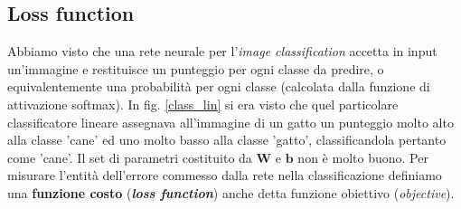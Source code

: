 \subsection{Loss function}
\label{loss}
Abbiamo visto che una rete neurale per l'\textit{image classification} accetta in input un'immagine e restituisce un punteggio per ogni classe da predire, o equivalentemente una probabilità per ogni classe (calcolata dalla funzione di attivazione softmax). In fig. \ref{class_lin} si era visto che quel particolare classificatore lineare assegnava all'immagine di un gatto un punteggio molto alto alla classe 'cane' ed uno molto basso alla classe 'gatto', classificandola pertanto come 'cane'. Il set di parametri costituito da $\mathbf{W}$ e $\mathbf{b}$ non è molto buono. Per misurare l'entità dell'errore commesso dalla rete nella classificazione definiamo una \textbf{funzione costo} (\textbf{\textit{loss function}}) anche detta funzione obiettivo (\textit{objective}).

